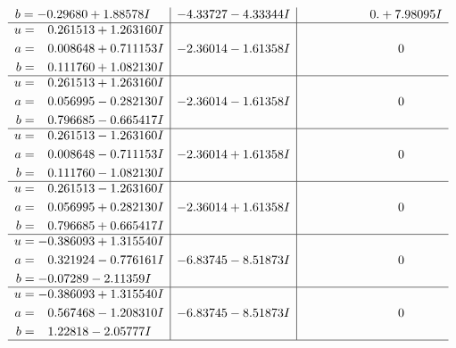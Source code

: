 \documentclass[1p]{elsarticle_modified}
\theoremstyle{definition}
\begin{document}
$$\begin{array}{c|c|c}
\begin{aligned}
b &= -0.29680 + 1.88578 I\end{aligned}
 & -4.33727 - 4.33344 I & \phantom{-0.000000 -}0. + 7.98095 I \\ \hline\begin{aligned}
u &= \phantom{-}0.261513 + 1.263160 I \\
a &= \phantom{-}0.008648 + 0.711153 I \\
b &= \phantom{-}0.111760 + 1.082130 I\end{aligned}
 & -2.36014 - 1.61358 I & \phantom{-0.000000 } 0 \\ \hline\begin{aligned}
u &= \phantom{-}0.261513 + 1.263160 I \\
a &= \phantom{-}0.056995 - 0.282130 I \\
b &= \phantom{-}0.796685 - 0.665417 I\end{aligned}
 & -2.36014 - 1.61358 I & \phantom{-0.000000 } 0 \\ \hline\begin{aligned}
u &= \phantom{-}0.261513 - 1.263160 I \\
a &= \phantom{-}0.008648 - 0.711153 I \\
b &= \phantom{-}0.111760 - 1.082130 I\end{aligned}
 & -2.36014 + 1.61358 I & \phantom{-0.000000 } 0 \\ \hline\begin{aligned}
u &= \phantom{-}0.261513 - 1.263160 I \\
a &= \phantom{-}0.056995 + 0.282130 I \\
b &= \phantom{-}0.796685 + 0.665417 I\end{aligned}
 & -2.36014 + 1.61358 I & \phantom{-0.000000 } 0 \\ \hline\begin{aligned}
u &= -0.386093 + 1.315540 I \\
a &= \phantom{-}0.321924 - 0.776161 I \\
b &= -0.07289 - 2.11359 I\end{aligned}
 & -6.83745 - 8.51873 I & \phantom{-0.000000 } 0 \\ \hline\begin{aligned}
u &= -0.386093 + 1.315540 I \\
a &= \phantom{-}0.567468 - 1.208310 I \\
b &= \phantom{-}1.22818 - 2.05777 I\end{aligned}
 & -6.83745 - 8.51873 I & \phantom{-0.000000 } 0\\
 \hline 

\end{array}$$
\end{document}
